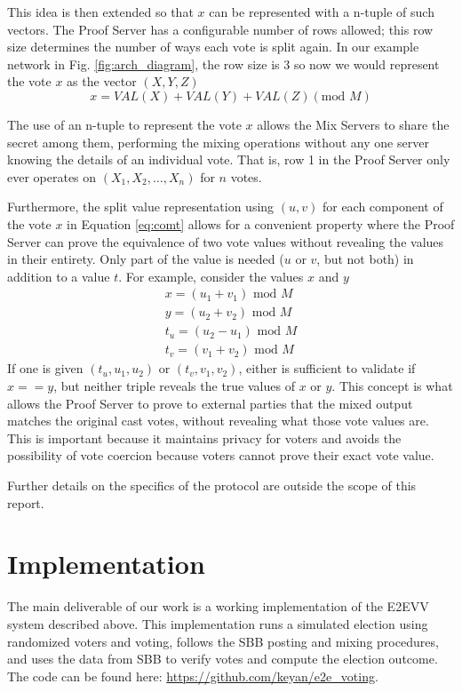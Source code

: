 \documentclass{article}
\begin{document}
This idea is then extended so that $x$ can be represented with a n-tuple of such vectors. The Proof Server has a configurable number of rows allowed; this row size determines the number of ways each vote is split again. In our example network in Fig. \ref{fig:arch_diagram}, the row size is $3$ so now we would represent the vote $x$ as the vector $(X, Y, Z)$
\begin{equation} \label{eq:comt}
    x = \mathit{VAL}(X) + \mathit{VAL}(Y) + \mathit{VAL}(Z) (\mbox{mod } M)
\end{equation}

The use of an n-tuple to represent the vote $x$ allows the Mix Servers to share the secret among them, performing the mixing operations without any one server knowing the details of an individual vote. That is, row 1 in the Proof Server only ever operates on $(X_1, X_2, \dots, X_n)$ for $n$ votes.

Furthermore, the split value representation using $(u, v)$ for each component of the vote $x$ in Equation \ref{eq:comt} allows for a convenient property where the Proof Server can prove the equivalence of two vote values without revealing the values in their entirety. Only part of the value is needed ($u$ or $v$, but not both) in addition to a value $t$. For example, consider the values $x$ and $y$
\begin{align*} \label{eq:comt}
    x = (u_1 + v_1) \mbox{ mod } M \\
    y = (u_2 + v_2) \mbox{ mod } M \\
    t_u = (u_2 - u_1) \mbox{ mod } M \\
    t_v = (v_1 + v_2) \mbox{ mod } M
\end{align*}
If one is given $(t_u, u_1, u_2)$ or $(t_v, v_1, v_2)$, either is sufficient to validate if $x == y$, but neither triple reveals the true values of $x$ or $y$. This concept is what allows the Proof Server to prove to external parties that the mixed output matches the original cast votes, without revealing what those vote values are. This is important because it maintains privacy for voters and avoids the possibility of vote coercion because voters cannot prove their exact vote value.

Further details on the specifics of the protocol are outside the scope of this report.

\section{Implementation}
The main deliverable of our work is a working implementation of the E2EVV system described above. This implementation runs a simulated election using randomized voters and voting, follows the SBB posting and mixing procedures, and uses the data from SBB to verify votes and compute the election outcome. The code can be found here: \url{https://github.com/keyan/e2e_voting}.
\end{document}
